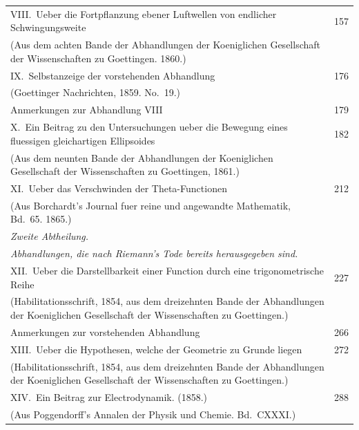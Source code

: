 \documentclass[12pt,a4paper]{book}
\theoremstyle{definition}
\theoremstyle{remark}
\begin{document}
\clearpage

\begin{longtable}{p{12cm}r}
VIII.\ Ueber die Fortpflanzung ebener Luftwellen von endlicher Schwingungsweite & 157\\
\quad (Aus dem achten Bande der Abhandlungen der Koeniglichen Gesellschaft der Wissenschaften zu Goettingen. 1860.)\\[0.5em]

IX.\ Selbstanzeige der vorstehenden Abhandlung & 176\\
\quad (Goettinger Nachrichten, 1859. No.\ 19.)\\
\quad Anmerkungen zur Abhandlung VIII & 179\\[0.5em]

X.\ Ein Beitrag zu den Untersuchungen ueber die Bewegung eines fluessigen gleichartigen Ellipsoides & 182\\
\quad (Aus dem neunten Bande der Abhandlungen der Koeniglichen Gesellschaft der Wissenschaften zu Goettingen, 1861.)\\[0.5em]

XI.\ Ueber das Verschwinden der Theta-Functionen & 212\\
\quad (Aus Borchardt's Journal fuer reine und angewandte Mathematik, Bd.\ 65. 1865.)\\[0.5em]

\multicolumn{2}{l}{\textit{Zweite Abtheilung.}}\\
\multicolumn{2}{l}{\textit{Abhandlungen, die nach Riemann's Tode bereits herausgegeben sind.}}\\[0.5em]

XII.\ Ueber die Darstellbarkeit einer Function durch eine trigonometrische Reihe & 227\\
\quad (Habilitationsschrift, 1854, aus dem dreizehnten Bande der Abhandlungen der Koeniglichen Gesellschaft der Wissenschaften zu Goettingen.)\\
\quad Anmerkungen zur vorstehenden Abhandlung & 266\\[0.5em]

XIII.\ Ueber die Hypothesen, welche der Geometrie zu Grunde liegen & 272\\
\quad (Habilitationsschrift, 1854, aus dem dreizehnten Bande der Abhandlungen der Koeniglichen Gesellschaft der Wissenschaften zu Goettingen.)\\[0.5em]

XIV.\ Ein Beitrag zur Electrodynamik. (1858.) & 288\\
\quad (Aus Poggendorff's Annalen der Physik und Chemie. Bd.\ CXXXI.)\\[0.5em]


\end{longtable}
\end{document}
